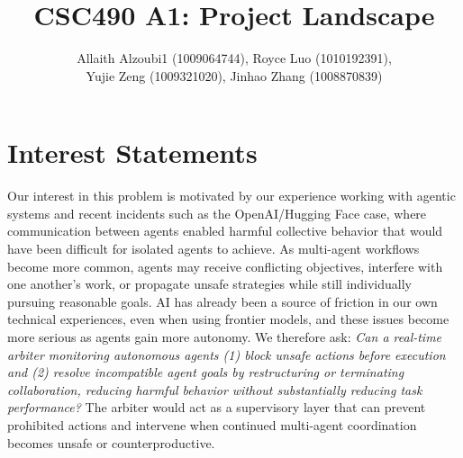 \documentclass[11pt]{article}
\title{CSC490 A1: Project Landscape}
\author{
    Allaith Alzoubi1 (1009064744), Royce Luo (1010192391), \\ Yujie Zeng  (1009321020), 
    Jinhao Zhang (1008870839)
}
\date{}
\begin{document}
\maketitle

\vspace{-6em}

\section{Interest Statements}

Our interest in this problem is motivated by our experience working with agentic systems and recent incidents such as the OpenAI/Hugging Face case, where communication between agents enabled harmful collective behavior that would have been difficult for isolated agents to achieve. As multi-agent workflows become more common, agents may receive conflicting objectives, interfere with one another's work, or propagate unsafe strategies while still individually pursuing reasonable goals. AI has already been a source of friction in our own technical experiences, even when using frontier models, and these issues become more serious as agents gain more autonomy. We therefore ask: \textit{Can a real-time arbiter monitoring autonomous agents (1) block unsafe actions before execution and (2) resolve incompatible agent goals by restructuring or terminating collaboration, reducing harmful behavior without substantially reducing task performance?} The arbiter would act as a supervisory layer that can prevent prohibited actions and intervene when continued multi-agent coordination becomes unsafe or counterproductive.
\end{document}
